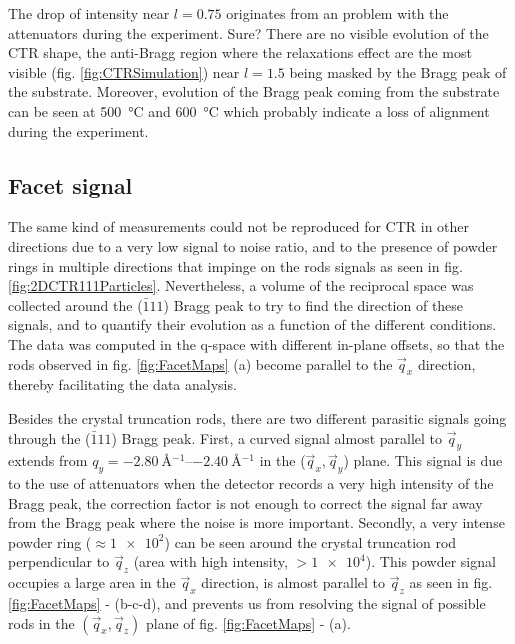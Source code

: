 The drop of intensity near $l=0.75$ originates from an problem with the attenuators during the experiment.
\textcolor{Important}{Sure?}
There are no visible evolution of the CTR shape, the anti-Bragg region where the relaxations effect are the most visible (fig. \ref{fig:CTRSimulation}) near $l=1.5$ being masked by the Bragg peak of the substrate.
Moreover, evolution of the Bragg peak coming from the substrate can be seen at \qty{500}{\degreeCelsius} and \qty{600}{\degreeCelsius} which probably indicate a loss of alignment during the experiment.

\subsection{Facet signal}

The same kind of measurements could not be reproduced for CTR in other directions due to a very low signal to noise ratio, and to the presence of powder rings in multiple directions that impinge on the rods signals as seen in fig. \ref{fig:2DCTR111Particles}.
Nevertheless, a volume of the reciprocal space was collected around the ($\bar{1}11$) Bragg peak to try to find the direction of these signals, and to quantify their evolution as a function of the different conditions.
The data was computed in the q-space with different in-plane offsets, so that the rods observed in fig. \ref{fig:FacetMaps} (a) become parallel to the $\vec{q}_x$ direction, thereby facilitating the data analysis.

Besides the crystal truncation rods, there are two different parasitic signals going through the ($\bar{1}11$) Bragg peak.
First, a curved signal almost parallel to $\vec{q}_y$ extends from $q_y = \qtyrange{-2.80}{-2.40}{\angstrom^{-1}}$ in the ($\vec{q}_x, \vec{q}_y$) plane.
This signal is due to the use of attenuators when the detector records a very high intensity of the Bragg peak, the correction factor is not enough to correct the signal far away from the Bragg peak where the noise is more important.
Secondly, a very intense powder ring ($\approx \num{1e2}$) can be seen around the crystal truncation rod perpendicular to $\vec{q}_z$ (area with high intensity, $> \num{1e4}$).
This powder signal occupies a large area in the $\vec{q}_x$ direction, is almost parallel to $\vec{q}_z$ as seen in fig. \ref{fig:FacetMaps} - (b-c-d), and prevents us from resolving the signal of possible rods in the $(\vec{q}_x, \vec{q}_z)$ plane of fig. \ref{fig:FacetMaps} - (a).

